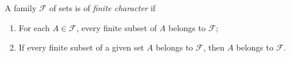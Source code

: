 \documentclass[12pt]{article}
\begin{document}
A family $\mathcal{F}$ of sets is of \emph{finite character} if 

\begin{enumerate}
\item For each $A\in \mathcal{F}$, every finite subset of $A$ belongs to $\mathcal{F}$;
\item If every finite subset of a given set $A$ belongs to $\mathcal{F}$, then $A$ belongs to $\mathcal{F}$.
\end{enumerate}
\end{document}
